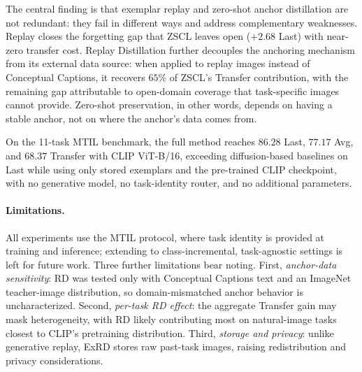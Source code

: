 \documentclass{article}
\begin{document}
The central finding is that exemplar replay and zero-shot anchor distillation are
not redundant: they fail in different ways and address complementary weaknesses.
Replay closes the forgetting gap that ZSCL leaves open ($+2.68$ Last) with near-zero transfer cost. Replay Distillation further decouples the anchoring
mechanism from its external data source: when applied to replay images instead of Conceptual Captions, it recovers $65\%$ of ZSCL's Transfer contribution, with the remaining gap attributable to open-domain coverage that task-specific images cannot provide. Zero-shot preservation, in other words, depends on having a stable anchor, not on where the anchor's data comes from.

On the 11-task MTIL benchmark, the full method reaches $86.28$ Last, $77.17$ Avg, and $68.37$ Transfer with CLIP ViT-B/16, exceeding diffusion-based baselines on Last while using only stored exemplars and the pre-trained CLIP checkpoint, with no generative model, no task-identity router, and no additional parameters.

\paragraph{Limitations.}All experiments use the MTIL protocol, where task identity is provided at training and inference; extending to class-incremental, task-agnostic settings is left for future work. Three further limitations bear noting. First, \emph{anchor-data sensitivity}: RD was tested only with Conceptual Captions text and an ImageNet teacher-image distribution, so domain-mismatched anchor behavior is uncharacterized. Second, \emph{per-task RD effect}: the aggregate Transfer gain may mask heterogeneity, with RD likely contributing most on natural-image tasks closest to CLIP's pretraining distribution. Third, \emph{storage and privacy}: unlike generative replay, ExRD stores raw past-task images, raising redistribution and privacy considerations.

  
  

   \appendix
\end{document}
